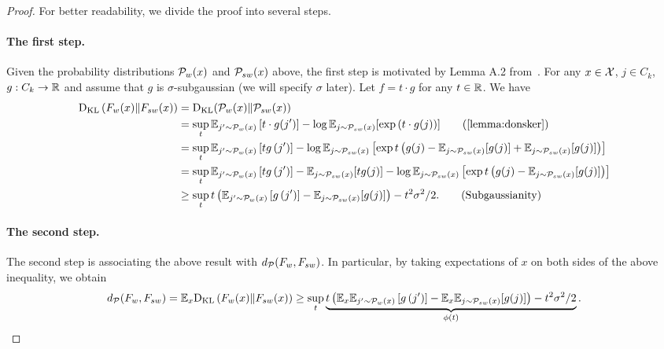 \begin{proof}

For better readability, we divide the proof into several steps.

\paragraph{The first step.}
Given the probability distributions $\mathcal{P}_{w}(x)$ and $\mathcal{P}_{sw}(x)$ above,
the first step is motivated by Lemma A.2 from~\citep{wang2022information}.
For any $x \in \mathcal{X}$, $j \in C_k$, $g: C_k \to \mathbb{R}$ and assume that $g$ is $\sigma$-subgaussian (we will specify $\sigma$ later).
Let $f=t \cdot g$ for any $t \in \mathbb{R}$.
We have
\begin{align*}
\mathrm{D}_{\mathrm{KL}}\left( F_w(x) \| F_{sw}(x) \right) & = \mathrm{D}_{\mathrm{KL}}(\cP_w(x) \| \cP_{sw}(x)) \\
& = \sup_t \mathbb{E}_{j^{\prime} \sim \cP_w(x)}\left[t \cdot g(j') \right]-\log \mathbb{E}_{j \sim \cP_{sw}(x)}[\exp \left(t \cdot g(j) \right)] \tag{\cref{lemma:donsker}} \\
& =\sup_t \mathbb{E}_{j^{\prime} \sim \cP_w(x)}\left[tg\left(j^{\prime}\right)\right]-\log \mathbb{E}_{j \sim \cP_{sw}(x)}\left[\exp t\left(g(j)-\mathbb{E}_{j \sim \cP_{sw}(x)}[g(j)]+\mathbb{E}_{j \sim \cP_{sw}(x)}[g(j)]\right)\right] \\
& =\sup_t \mathbb{E}_{j^{\prime} \sim \cP_w(x)}\left[t g\left(j^{\prime}\right)\right]-\mathbb{E}_{j \sim \cP_{sw}(x)}[tg(j)]-\log \mathbb{E}_{j \sim \cP_{sw}(x)}\left[\exp t\left(g(j)-\mathbb{E}_{j \sim \cP_{sw}(x)}[g(j)]\right)\right] \\
& \geq \sup _t t\left(\mathbb{E}_{j^{\prime} \sim \cP_w(x)}\left[g\left(j^{\prime}\right)\right]-\mathbb{E}_{j \sim \cP_{sw}(x)}[g(j)]\right)-t^2 \sigma^2 / 2. \tag{Subgaussianity}
\end{align*}

\paragraph{The second step.}
The second step is associating the above result with $d_\mathcal{P}(F_w, F_{sw})$.
In particular, by taking expectations of $x$ on both sides of the above inequality, we obtain
$$d_\mathcal{P}(F_w, F_{sw}) = \mathbb{E}_x \mathrm{D}_{\mathrm{KL}}\left( F_w(x) \| F_{sw}(x) \right) \ge \sup _t \underbrace{t\left(\mathbb{E}_x\mathbb{E}_{j^{\prime} \sim \mathcal{P}_w(x)}\left[g\left(j^{\prime}\right)\right]-\mathbb{E}_x\mathbb{E}_{j \sim \mathcal{P}_{sw}(x)}[g(j)]\right)-t^2 \sigma^2 / 2}_{\phi(t)}.$$



\end{proof}
